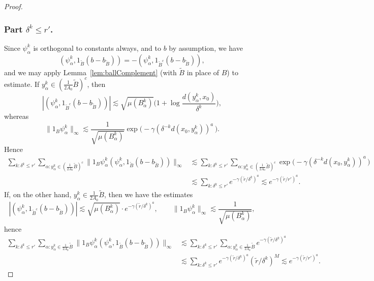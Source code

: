 \documentclass{amsart}
\numberwithin{equation}{section}
\theoremstyle{plain}
\theoremstyle{definition}
\theoremstyle{remark}
\begin{document}
{{{\begin{proof}
\subsubsection*{Part $\delta^k\leq r'$.}
Since $\psi^k_\alpha$ is orthogonal to constants always, and to $b$ by assumption, we have
\begin{equation*}
  (\psi^k_\alpha,1_{\tilde{B}}(b-b_{\tilde{B}}))
  =-(\psi^k_\alpha,1_{\tilde{B}^c}(b-b_{\tilde{B}})),
\end{equation*}
and we may apply Lemma~\ref{lem:ballComplement} (with $\tilde{B}$ in place of $B$) to estimate. If $y^k_\alpha\in (\frac{1}{2A_0}\tilde{B})^c$, then
\begin{equation*}
  {|{(\psi^k_\alpha,1_{\tilde{B}^c}(b-b_{\tilde{B}}))}|}
  \lesssim\sqrt{\mu(B^k_\alpha)}\Big(1+\log\frac{d(y^k_\alpha,x_0)}{\delta^k}\Big),
\end{equation*}
whereas
\begin{equation*}
  {\|{1_B\psi^k_\alpha}\|_{{\infty}}} \lesssim\frac{1}{\sqrt{\mu(B^k_\alpha)}}\exp\big(-\gamma(\delta ^{-k}{d(x_0,y^k_{\alpha})})^a\, \big)
.
\end{equation*}
Hence
\begin{equation}\label{eq:smallScaleOut}
\begin{split}
  \sum_{k:\delta^k\leq r'}\sum_{\alpha:y^k_\alpha\in(\frac{1}{2A_0}\tilde{B})^c}{\|{1_B\psi^k_\alpha(\psi^k_\alpha,1_{\tilde{B}}(b-b_{\tilde{B}}))}\|_{{\infty}}}
  &\lesssim  \sum_{k:\delta^k\leq r'}\sum_{\alpha:y^k_\alpha\in(\frac{1}{2A_0}\tilde{B})^c}\exp\big(-\gamma(\delta ^{-k}{d(x_0,y^k_{\alpha})})^a\, \big)
 \\
  &\lesssim  \sum_{k:\delta^k\leq r'}e^{-\gamma(\tilde{r}/\delta^k)^a}
  \lesssim e^{-\gamma(\tilde{r}/r')^a}.
\end{split}
\end{equation}
If, on the other hand, $y^k_\alpha\in\frac{1}{2A_0}\tilde{B}$, then we have the estimates
\begin{equation*}
  {|{(\psi^k_\alpha,1_{\tilde{B}^c}(b-b_{\tilde{B}}))}|}
  \lesssim\sqrt{\mu(B^k_\alpha)}\cdot e^{-\gamma(\tilde{r}/\delta^k)^a},\qquad
  {\|{1_B\psi^k_\alpha}\|_{{\infty}}} \lesssim\frac{1}{\sqrt{\mu(B^k_\alpha)}},
\end{equation*}
hence
\begin{equation}\label{eq:smallScaleIn}
\begin{split}
  \sum_{k:\delta^k\leq r'}\sum_{\alpha:y^k_\alpha\in\frac{1}{2A_0}\tilde{B}}{\|{1_B\psi^k_\alpha(\psi^k_\alpha,1_{\tilde{B}}(b-b_{\tilde{B}}))}\|_{{\infty}}}
  &\lesssim  \sum_{k:\delta^k\leq r'}\sum_{\alpha:y^k_\alpha\in \frac{1}{2A_0}\tilde{B}} e^{-\gamma(\tilde{r}/\delta^k)^a} \\
  &\lesssim  \sum_{k:\delta^k\leq r'}e^{-\gamma(\tilde{r}/\delta^k)^a}(\tilde{r}/\delta^k)^M
  \lesssim e^{-\gamma(\tilde{r}/r')^a}.
\end{split}
\end{equation}


\end{proof}}}}
\end{document}
